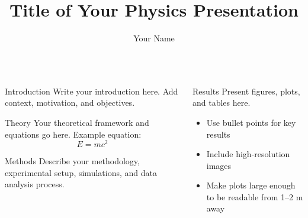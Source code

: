 \documentclass[final]{beamer}
\title{\textbf{Title of Your Physics Presentation}}
\author{Your Name}
\institute{Institute of Physics (IFUS)}
\begin{document}
\begin{frame}[t]

\begin{center}
  {\fontsize{60}{70}\selectfont \bfseries \inserttitle \par}
  \vspace{1cm}
  {\fontsize{40}{48}\selectfont \insertauthor \par}
  \vspace{0.5cm}
  {\fontsize{36}{44}\selectfont \insertinstitute \par}
\end{center}

\vspace{1.5cm}

\begin{columns}[t,totalwidth=\textwidth]

\begin{column}{0.48\textwidth}
  \begin{block}{Introduction}
    Write your introduction here. 
    Add context, motivation, and objectives.
  \end{block}

  \begin{block}{Theory}
    Your theoretical framework and equations go here.
    Example equation:
    \[
      E = mc^2
    \]
  \end{block}

  \begin{block}{Methods}
    Describe your methodology, experimental setup, 
    simulations, and data analysis process.
  \end{block}
\end{column}

\begin{column}{0.48\textwidth}
  \begin{block}{Results}
    Present figures, plots, and tables here.
    \begin{center}
    \begin{itemize}
      \item Use bullet points for key results
      \item Include high-resolution images
      \item Make plots large enough to be readable from 1–2 m away
    \end{itemize}
    \end{center}
  \end{block}


\end{column}
\end{columns}
\end{frame}
\end{document}
